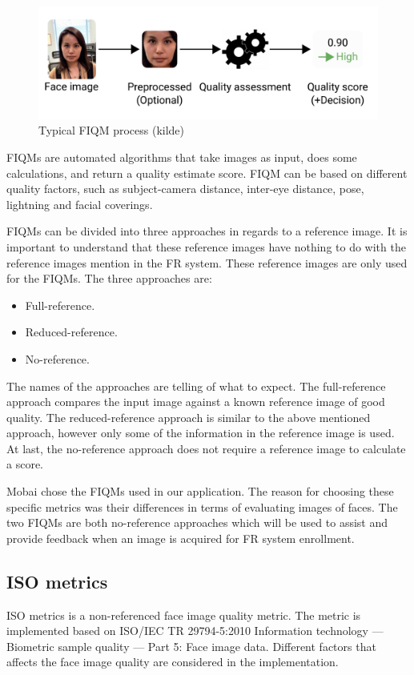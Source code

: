 \begin{figure}[h]
    \centering
    \includegraphics[scale = 0.45]{figures/FIQM.png}
    \caption{Typical FIQM process (kilde)}
    \label{fig:fiqm}
\end{figure}

FIQMs are automated algorithms that take images as input, does some calculations, and return a quality estimate score. FIQM can be based on different quality factors, such as subject-camera distance, inter-eye distance, pose, lightning and facial coverings. 

FIQMs can be divided into three approaches in regards to a reference image. It is important to understand that these reference images have nothing to do with the reference images mention in the FR system. These reference images are only used for the FIQMs. The three approaches are: 

\begin{itemize}
    \item Full-reference.
    \item Reduced-reference.
    \item No-reference. 
\end{itemize}

The names of the approaches are telling of what to expect. The full-reference approach compares the input image against a known reference image of good quality. The reduced-reference approach is similar to the above mentioned approach, however only some of the information in the reference image is used. At last, the no-reference approach does not require a reference image to calculate a score. 

Mobai chose the FIQMs used in our application. The reason for choosing these specific metrics was their differences in terms of evaluating images of faces. The two FIQMs are both no-reference approaches which will be used to assist and provide feedback when an image is acquired for FR system enrollment. 


\subsection{ISO metrics}
ISO metrics is a non-referenced face image quality metric. The metric is implemented based on ISO/IEC TR 29794-5:2010 Information technology — Biometric sample quality — Part 5: Face image data. Different factors that affects the face image quality are considered in the implementation. 

